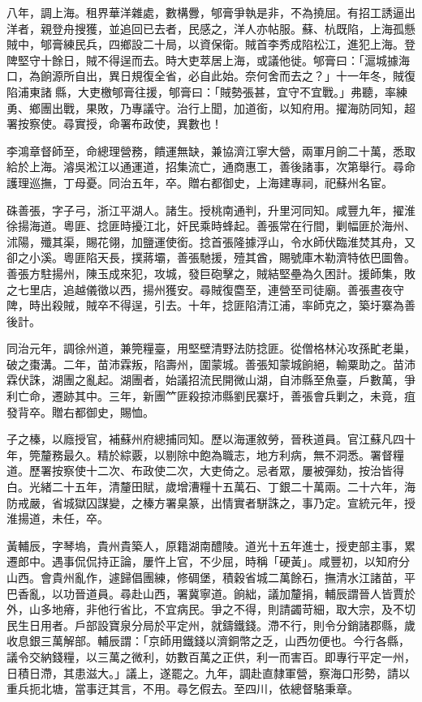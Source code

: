 \begin{pinyinscope}
八年，調上海。租界華洋雜處，數構釁，郇膏爭執是非，不為撓屈。有招工誘逼出洋者，親登舟搜獲，並追回已去者，民感之，洋人亦帖服。蘇、杭既陷，上海孤懸賊中，郇膏練民兵，四鄉設二十局，以資保衛。賊首李秀成陷松江，進犯上海。登陴堅守十餘日，賊不得逞而去。時大吏萃居上海，或議他徙。郇膏曰：「滬城據海口，為餉源所自出，異日規復全省，必自此始。奈何舍而去之？」十一年冬，賊復陷浦東諸縣，大吏檄郇膏往援，郇膏曰：「賊勢張甚，宜守不宜戰。」弗聽，率練勇、鄉團出戰，果敗，乃專議守。治行上聞，加道銜，以知府用。擢海防同知，超署按察使。尋實授，命署布政使，異數也！

李鴻章督師至，命總理營務，饋運無缺，兼協濟江寧大營，兩軍月餉二十萬，悉取給於上海。濬吳淞江以通運道，招集流亡，通商惠工，善後諸事，次第舉行。尋命護理巡撫，丁母憂。同治五年，卒。贈右都御史，上海建專祠，祀蘇州名宦。

硃善張，字子弓，浙江平湖人。諸生。授桃南通判，升里河同知。咸豐九年，擢淮徐揚海道。粵匪、捻匪時擾江北，奸民乘時蜂起。善張常在行間，剿幅匪於海州、沭陽，殲其渠，賜花翎，加鹽運使銜。捻首張隆據浮山，令水師伏臨淮焚其舟，又卻之小溪。粵匪陷天長，撲蔣壩，善張馳援，殪其酋，賜號庫木勒濟特依巴圖魯。善張方駐揚州，陳玉成來犯，攻城，發巨砲擊之，賊結堅壘為久困計。援師集，敗之七里店，追越儀徵以西，揚州獲安。尋賊復麕至，連營至司徒廟。善張晝夜守陴，時出殺賊，賊卒不得逞，引去。十年，捻匪陷清江浦，率師克之，築圩寨為善後計。

同治元年，調徐州道，兼筦糧臺，用堅壁清野法防捻匪。從僧格林沁攻孫甿老巢，破之棗溝。二年，苗沛霖叛，陷壽州，圍蒙城。善張知蒙城餉絕，輸粟助之。苗沛霖伏誅，湖團之亂起。湖團者，始議招流民開微山湖，自沛縣至魚臺，戶數萬，爭利亡命，遷跡其中。三年，新團𥫗匪殺掠沛縣劉民寨圩，善張會兵剿之，未竟，疽發背卒。贈右都御史，賜恤。

子之榛，以廕授官，補蘇州府總捕同知。歷以海運敘勞，晉秩道員。官江蘇凡四十年，筦釐務最久。精於綜覈，以剔除中飽為職志，地方利病，無不洞悉。署督糧道。歷署按察使十二次、布政使二次，大吏倚之。忌者眾，屢被彈劾，按治皆得白。光緒二十五年，清釐田賦，歲增漕糧十五萬石、丁銀二十萬兩。二十六年，海防戒嚴，省城獄囚謀變，之榛方署臬篆，出情實者駢誅之，事乃定。宣統元年，授淮揚道，未任，卒。

黃輔辰，字琴塢，貴州貴築人，原籍湖南醴陵。道光十五年進士，授吏部主事，累遷郎中。遇事侃侃持正論，屢忤上官，不少屈，時稱「硬黃」。咸豐初，以知府分山西。會貴州亂作，遽歸倡團練，修碉堡，積穀省城二萬餘石，撫清水江諸苗，平巴香亂，以功晉道員。尋赴山西，署冀寧道。餉絀，議加釐捐，輔辰謂晉人皆賈於外，山多地瘠，非他行省比，不宜病民。爭之不得，則請蠲苛細，取大宗，及不切民生日用者。戶部設寶泉分局於平定州，就鑄鐵錢。滯不行，則令分銷諸郡縣，歲收息銀三萬解部。輔辰謂：「京師用鐵錢以濟銅幣之乏，山西勿便也。今行各縣，議令交納錢糧，以三萬之微利，妨數百萬之正供，利一而害百。即專行平定一州，日積日滯，其患滋大。」議上，遂罷之。九年，調赴直隸軍營，察海口形勢，請以重兵扼北塘，當事迂其言，不用。尋乞假去。至四川，依總督駱秉章。


\end{pinyinscope}
